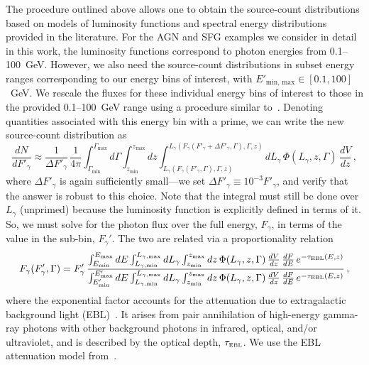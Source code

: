 The procedure outlined above allows one to obtain the source-count distributions based on models of luminosity functions and spectral energy distributions provided in the literature. For the AGN and SFG examples we consider in detail in this work, the luminosity functions correspond to photon energies from 0.1--100~GeV.  However, we also need the source-count distributions in subset energy ranges corresponding to our energy bins of interest, with $E'_\text{min, max}\in [0.1, 100]$~GeV.  We rescale the fluxes for these individual energy bins of interest to those in the provided 0.1--100~GeV range using a procedure similar to~\cite{DiMauro:2014wha}. Denoting quantities associated with this energy bin with a prime, we can write the new source-count distribution as
\begin{equation}
\frac{dN}{dF'_\gamma}\approx \frac{1}{\Delta F'_\gamma} \, \frac{1}{4\pi} \int_{\Gamma_\text{min}}^{\Gamma_\text{max}} d\Gamma \int_{z_\text{min}}^{z_\text{max}} dz \int_{L_\gamma(F_\gamma(F'_\gamma,\Gamma),\Gamma,z)}^{L_\gamma(F_\gamma(F'_\gamma+\Delta F'_\gamma,\Gamma),\Gamma,z)} dL_\gamma \, \Phi(L_\gamma,z,\Gamma) \, \frac{dV}{dz} \, ,
\label{eq: dNdFprime}
\end{equation}
where $\Delta F'_\gamma$ is again sufficiently small---we set $\Delta F'_\gamma \equiv 10^{-3} F'_\gamma$, and verify that the answer is robust to this choice. Note that the integral must still be done over $L_\gamma$ (unprimed) because the luminosity function is explicitly defined in terms of it.  So, we must solve for the photon flux over the full energy, $F_\gamma$, in terms of the value in the sub-bin, $F_\gamma'$.  The two are related via a proportionality relation
\begin{equation}
F_\gamma(F'_\gamma,\Gamma) = F'_\gamma \, \frac{\int_{E_\text{min}}^{E_\text{max}}  dE \int_{L_{\gamma,\text{min}}}^{L_{\gamma,\text{max}}} dL_{\gamma}\int_{z_\text{min}}^{z_\text{max}} dz \,  \Phi(L_\gamma,z,\Gamma) \, \frac{dV}{dz} \, \frac{dF}{dE}\,e^{-\tau_\text{\tiny{EBL}}(E,z)}}{\int_{E'_\text{min}}^{E'_\text{max}}  dE \int_{L_{\gamma,\text{min}}}^{L_{\gamma,\text{max}}} dL_{\gamma}\int_{z_\text{min}}^{z_\text{max}} dz \, \Phi(L_\gamma,z,\Gamma) \, \frac{dV}{dz} \, \frac{dF}{dE}\,e^{-\tau_\text{\tiny{EBL}}(E,z)}} \, ,
\end{equation}
where the exponential factor accounts for the attenuation due to extragalactic background light (EBL)~\cite{Gould:1966pza, Fazio:1970pr, 1992ApJ...390L..49S, Franceschini:2008tp, 2012Sci...338.1190A,Abramowski:2012ry,Dominguez:2013lfa}.  It arises from pair annihilation of high-energy gamma-ray photons with other background photons in infrared, optical, and/or ultraviolet, and is described by the optical depth, $\tau_\text{\tiny{EBL}}$.  We use the EBL attenuation model from~\cite{2010ApJ...712..238F}.  

